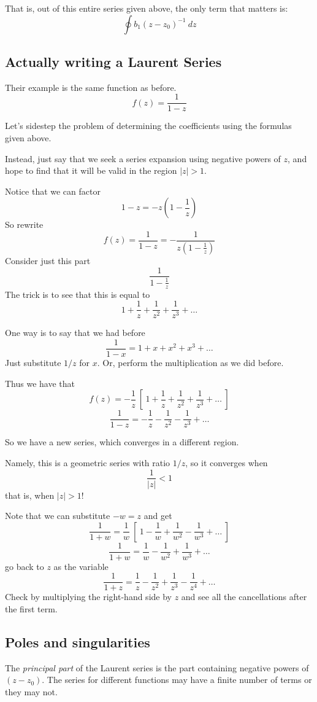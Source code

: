 \documentclass[11pt, oneside]{article}   	%
\begin{document}
That is, out of this entire series given above, the only term that matters is:
\[ \oint b_1(z-z_0)^{-1} \ dz \]

\subsection*{Actually writing a Laurent Series}
Their example is the same function as before.
\[ f(z) = \frac{1}{1-z} \]

Let's sidestep the problem of determining the coefficients using the formulas given above.

Instead, just say that we seek a series expansion using negative powers of $z$, and hope to find that it will be valid in the region $|z| > 1$.

Notice that we can factor
\[ 1 - z = -z (1 - \frac{1}{z}) \]
So rewrite
\[ f(z) = \frac{1}{1-z} = -\frac{1}{z (1 - \frac{1}{z})} \]
Consider just this part
\[ \frac{1}{1 - \frac{1}{z}} \]
The trick is to see that this is equal to 
\[ 1 + \frac{1}{z} + \frac{1}{z^2} + \frac{1}{z^3} + \dots \]

One way is to say that we had before
\[ \frac{1}{1 - x} = 1 + x + x^2 + x^3 + \dots \]
Just substitute $1/z$ for $x$.  Or, perform the multiplication as we did before.  

Thus we have that
\[ f(z) = -\frac{1}{z} \ [ \ 1 + \frac{1}{z} + \frac{1}{z^2} + \frac{1}{z^3} + \dots \ ] \]
\[ \frac{1}{1-z} = - \frac{1}{z} - \frac{1}{z^2} - \frac{1}{z^3} + \dots \]

So we have a new series, which converges in a different region.

Namely, this is a geometric series with ratio $1/z$, so it converges when 
\[ \frac{1}{|z|} < 1 \]
that is, when $|z| > 1$!

Note that we can substitute $-w = z$ and get
\[ \frac{1}{1+w} =  \frac{1}{w} \ [ \ 1 - \frac{1}{w} + \frac{1}{w^2} - \frac{1}{w^3} + \dots \ ] \]
\[ \frac{1}{1+w} =  \frac{1}{w} - \frac{1}{w^2} + \frac{1}{w^3} + \dots \]
go back to $z$ as the variable
\[ \frac{1}{1+z} =  \frac{1}{z} - \frac{1}{z^2} + \frac{1}{z^3} - \frac{1}{z^4} + \dots \]
Check by multiplying the right-hand side by $z$ and see all the cancellations after the first term.

\subsection*{Poles and singularities}
The \emph{principal part} of the Laurent series is the part containing negative powers of $(z - z_0)$.  The series for different functions may have a finite number of terms or they may not.  
\end{document}
